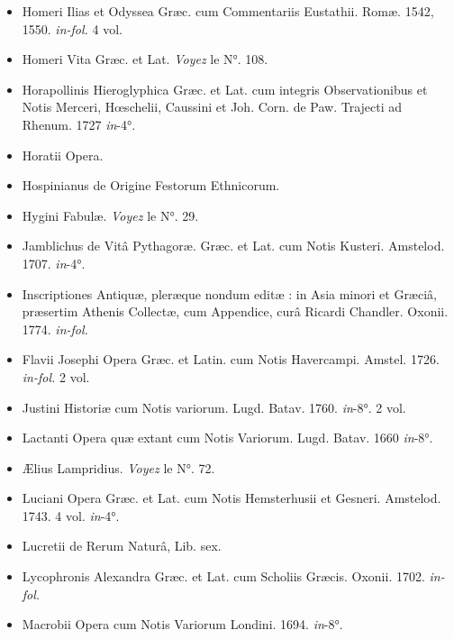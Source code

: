 \documentclass[a4paper, 11pt, oneside, polutonikogreek, french]{article}
\begin{document}
\begin{itemize}
    \item Homeri Ilias et Odyssea Græc. cum Commentariis Eustathii. Romæ. 1542, 1550. \emph{in-fol.} 4 vol.

    \item Homeri Vita Græc. et Lat. \emph{Voyez} le N°. 108.

    \item Horapollinis Hieroglyphica Græc. et Lat. cum integris Observationibus et Notis Merceri, Hœschelii, Caussini et Joh. Corn. de Paw. Trajecti ad Rhenum. 1727 \emph{in}-4°.

    \item Horatii Opera.

    \item Hospinianus de Origine Festorum Ethnicorum.

    \item Hygini Fabulæ. \emph{Voyez} le N°. 29.

    \item Jamblichus de Vitâ Pythagoræ. Græc. et Lat. cum Notis Kusteri. Amstelod. 1707. \emph{in}-4°.

    \item Inscriptiones Antiquæ, pleræque nondum editæ : in Asia minori et Græciâ, præsertim Athenis Collectæ, cum Appendice, curâ Ricardi Chandler. Oxonii. 1774. \emph{in-fol.}

    \item Flavii Josephi Opera Græc. et Latin. cum Notis Havercampi. Amstel. 1726. \emph{in-fol.} 2 vol.

    \item Justini Historiæ cum Notis variorum. Lugd. Batav. 1760. \emph{in}-8°. 2 vol.

    \item Lactanti Opera quæ extant cum Notis Variorum. Lugd. Batav. 1660 \emph{in}-8°.

    \item Ælius Lampridius. \emph{Voyez} le N°. 72.

    \item Luciani Opera Græc. et Lat. cum Notis Hemsterhusii et Gesneri. Amstelod. 1743. 4 vol. \emph{in}-4°.

    \item Lucretii de Rerum Naturâ, Lib. sex.

    \item Lycophronis Alexandra Græc. et Lat. cum Scholiis Græcis. Oxonii. 1702. \emph{in-fol.}

    \item Macrobii Opera cum Notis Variorum Londini. 1694. \emph{in}-8°.


\end{itemize}
\end{document}
